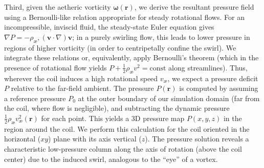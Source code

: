 \documentclass[twocolumn,aps,pre,floatfix,nofootinbib]{revtex4-2}
\begin{document}
Third, given the aetheric vorticity $\boldsymbol{\omega}(\mathbf{r})$, we derive the resultant pressure field using a Bernoulli-like relation appropriate for steady rotational flows. For an incompressible, inviscid fluid, the steady-state Euler equation gives $\nabla P = -\rho_{\text{æ}},(\mathbf{v}\cdot\nabla)\mathbf{v}$; in a purely swirling flow, this leads to lower pressure in regions of higher vorticity (in order to centripetally confine the swirl). We integrate these relations or, equivalently, apply Bernoulli’s theorem (which in the presence of rotational flow yields $P+\frac{1}{2}\rho_{\text{æ}}v^2=\text{const}$ along streamlines). Thus, wherever the coil induces a high rotational speed $v_{\text{æ}}$, we expect a pressure deficit $P$ relative to the far-field ambient. The pressure $P(\mathbf{r})$ is computed by assuming a reference pressure $P_0$ at the outer boundary of our simulation domain (far from the coil, where flow is negligible), and subtracting the dynamic pressure $\frac{1}{2}\rho_{\text{æ}} v_{\text{æ}}^2(\mathbf{r})$ for each point. This yields a 3D pressure map $P(x,y,z)$ in the region around the coil. We perform this calculation for the coil oriented in the horizontal ($xy$) plane with its axis vertical ($z$). The pressure solution reveals a characteristic low-pressure column along the axis of rotation (above the coil center) due to the induced swirl, analogous to the “eye” of a vortex.
\end{document}
